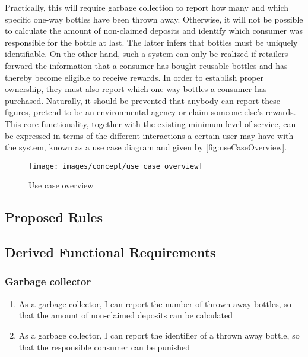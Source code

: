 Practically, this will require garbage collection to report how many and which specific one-way bottles have been thrown away. Otherwise, it will not be possible to calculate the amount of non-claimed deposits and identify which consumer was responsible for the bottle at last. The latter infers that bottles must be uniquely identifiable. On the other hand, such a system can only be realized if retailers forward the information that a consumer has bought reusable bottles and has thereby become eligible to receive rewards. In order to establish proper ownership, they must also report which one-way bottles a consumer has purchased. Naturally, it should be prevented that anybody can report these figures, pretend to be an environmental agency or claim someone else's rewards. This core functionality, together with the existing minimum level of service, can be expressed in terms of the different interactions a certain user may have with the system, known as a use case diagram and given by \autoref{fig:useCaseOverview}.

\begin{figure}[hbt]
  \texttt{[image: images/concept/use\_case\_overview]}
  \caption{Use case overview}
  \label{fig:useCaseOverview}
\end{figure}

\FloatBarrier


\subsection{Proposed Rules}




\def\twodigits#1{%
  \ifnum#1<10 0\fi
  \number#1}

\subsection{Derived Functional Requirements}

\subsubsection{Garbage collector}
\begin{enumerate}[label={\textbf{FR-\protect\twodigits{\theenumi}}},leftmargin=*]
	\item As a garbage collector, I can report the number of thrown away bottles, so that the amount of non-claimed deposits can be calculated
	\item As a garbage collector, I can report the identifier of a thrown away bottle, so that the responsible consumer can be punished
\end{enumerate}

